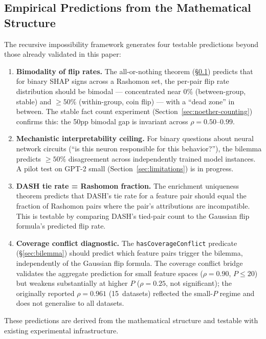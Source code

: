 \documentclass[11pt,a4paper]{article}
\begin{document}
\subsection{Empirical Predictions from the Mathematical Structure}
\label{sec:predictions}

The recursive impossibility framework generates four testable predictions beyond those already validated in this paper:

\begin{enumerate}
  \item \textbf{Bimodality of flip rates.} The all-or-nothing theorem (\S\ref{sec:predictions}) predicts that for binary SHAP signs across a Rashomon set, the per-pair flip rate distribution should be bimodal --- concentrated near $0\%$ (between-group, stable) and $\geq 50\%$ (within-group, coin flip) --- with a ``dead zone'' in between. The stable fact count experiment (Section~\ref{sec:noether-counting}) confirms this: the 50pp bimodal gap is invariant across $\rho = 0.50$--$0.99$.

  \item \textbf{Mechanistic interpretability ceiling.} For binary questions about neural network circuits (``is this neuron responsible for this behavior?''), the bilemma predicts $\geq 50\%$ disagreement across independently trained model instances. A pilot test on GPT-2 small (Section~\ref{sec:limitations}) is in progress.

  \item \textbf{DASH tie rate = Rashomon fraction.} The enrichment uniqueness theorem predicts that DASH's tie rate for a feature pair should equal the fraction of Rashomon pairs where the pair's attributions are incompatible. This is testable by comparing DASH's tied-pair count to the Gaussian flip formula's predicted flip rate.

  \item \textbf{Coverage conflict diagnostic.} The \texttt{hasCoverageConflict} predicate (\S\ref{sec:bilemma}) should predict which feature pairs trigger the bilemma, independently of the Gaussian flip formula. The coverage conflict bridge validates the aggregate prediction for small feature spaces ($\rho = 0.90$, $P \leq 20$) but weakens substantially at higher $P$ ($\rho = 0.25$, not significant); the originally reported $\rho = 0.961$ (15~datasets) reflected the small-$P$ regime and does not generalise to all datasets.
\end{enumerate}

These predictions are derived from the mathematical structure and testable with existing experimental infrastructure.
\end{document}
